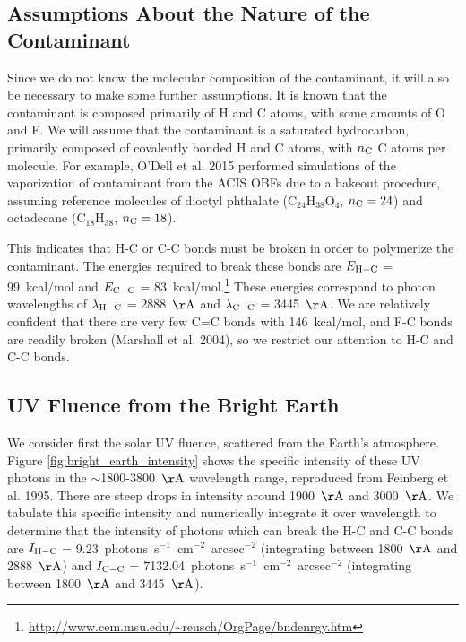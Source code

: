 \documentclass[11pt]{article}
\begin{document}
\subsection{Assumptions About the Nature of the Contaminant}

Since we do not know the molecular composition of the contaminant, it will also be necessary
to make some further assumptions. It is known that the contaminant is composed primarily of
H and C atoms, with some amounts of O and F. We will assume that the contaminant is a saturated
hydrocarbon, primarily composed of covalently bonded H and C atoms, with $n_{\rm C}$ C atoms
per molecule. For example, O'Dell et al. 2015 performed simulations of the vaporization of
contaminant from the ACIS OBFs due to a bakeout procedure, assuming reference molecules
of dioctyl phthalate (C$_{24}$H$_{38}$O$_4$, $n_{\rm C} = 24$) and octadecane (C$_{18}$H$_{38}$,
$n_{\rm C} = 18$).

This indicates that H-C or C-C bonds must be broken in order to polymerize the contaminant. The
energies required to break these bonds are $E_{\rm H-C}$ = 99~kcal/mol and $E_{\rm C-C}$ =
83~kcal/mol.\footnote{\url{http://www.cem.msu.edu/~reusch/OrgPage/bndenrgy.htm}} These energies
correspond to photon wavelengths of $\lambda_{\rm H-C}$ = 2888~${\rm \AA}$ and $\lambda_{\rm C-C}$
= 3445~${\rm \AA}$. We are relatively confident that there are very few C=C bonds with 146~kcal/mol,
and F-C bonds are readily broken (Marshall et al. 2004), so we restrict our attention to H-C and
C-C bonds.

\subsection{UV Fluence from the Bright Earth}\label{sec:earth}

We consider first the solar UV fluence, scattered from the Earth's atmosphere. Figure
\ref{fig:bright_earth_intensity} shows the specific intensity of these UV photons in
the $\sim$1800-3800~${\rm \AA}$ wavelength range, reproduced from Feinberg et al. 1995. There
are steep drops in intensity around 1900~${\rm \AA}$ and 3000~${\rm \AA}$. We tabulate
this specific intensity and numerically integrate it over wavelength to determine that
the intensity of photons which can break the H-C and C-C bonds are $I_{\rm H-C}$ =
9.23~photons~s$^{-1}$~cm$^{-2}$~arcsec$^{-2}$ (integrating between 1800~${\rm \AA}$ and
2888~${\rm \AA}$) and $I_{\rm C-C}$ = 7132.04~photons~s$^{-1}$~cm$^{-2}$~arcsec$^{-2}$
(integrating between 1800~${\rm \AA}$ and 3445~${\rm \AA}$).
\end{document}
